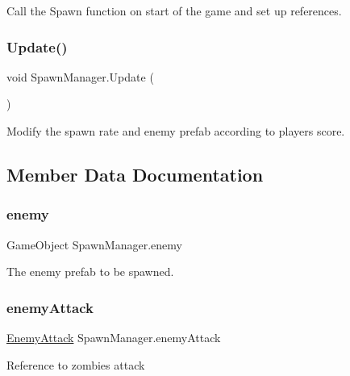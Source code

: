 Call the Spawn function on start of the game and set up references. 

\mbox{\label{class_spawn_manager_afbe4ba82b4859ad2510c1a175e230317}} 
\subsubsection{\texorpdfstring{Update()}{Update()}}
{\footnotesize\ttfamily void Spawn\+Manager.\+Update (\begin{DoxyParamCaption}{ }\end{DoxyParamCaption})\hspace{0.3cm}{\ttfamily [private]}}



Modify the spawn rate and enemy prefab according to player\textquotesingle{}s score. 



\subsection{Member Data Documentation}
\mbox{\label{class_spawn_manager_adec1aee76f000ec159170d182b5e60df}} 
\subsubsection{\texorpdfstring{enemy}{enemy}}
{\footnotesize\ttfamily Game\+Object Spawn\+Manager.\+enemy}

The enemy prefab to be spawned. \mbox{\label{class_spawn_manager_ae0d3001eb2a5db246a350131ed9ad609}} 
\subsubsection{\texorpdfstring{enemyAttack}{enemyAttack}}
{\footnotesize\ttfamily \mbox{\hyperlink{class_enemy_attack}{Enemy\+Attack}} Spawn\+Manager.\+enemy\+Attack\hspace{0.3cm}{\ttfamily [private]}}

Reference to zombie\textquotesingle{}s attack \mbox{\label{class_spawn_manager_a9d0bb95f08bec927e6c1bc5b9d5867dc}} 
